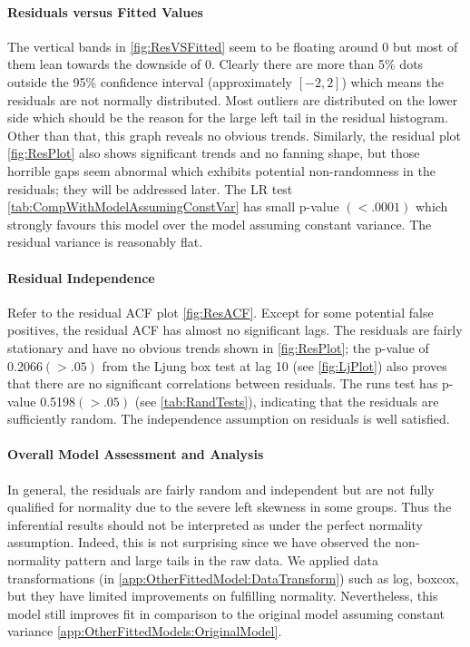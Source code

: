 \documentclass{report}
\begin{document}
\paragraph{Residuals versus Fitted Values}
The vertical bands in \ref{fig:ResVSFitted} seem to be floating around 0 but most of them lean towards the downside of 0. Clearly there are more than 5\% dots outside the 95\% confidence interval (approximately $[-2,2]$) which means the residuals are not normally distributed. Most outliers are distributed on the lower side which should be the reason for the large left tail in the residual histogram. Other than that, this graph reveals no obvious trends. Similarly, the residual plot \ref{fig:ResPlot} also shows significant trends and no fanning shape, but those horrible gaps seem abnormal which exhibits potential non-randomness in the residuals; they will be addressed later. The LR test \ref{tab:CompWithModelAssumingConstVar} has small p-value $(<.0001)$ which strongly favours this model over the model assuming constant variance. The residual variance is reasonably flat.

\paragraph{Residual Independence} Refer to the residual ACF plot \ref{fig:ResACF}. Except for some potential false positives, the residual ACF has almost no significant lags. The residuals are fairly stationary and have no obvious trends shown in \ref{fig:ResPlot}; the p-value of 0.2066$(>.05)$ from the Ljung box test at lag 10 (see \ref{fig:LjPlot}) also proves that there are no significant correlations between residuals. The runs test has p-value 0.5198$(>.05)$ (see \ref{tab:RandTests}), indicating that the residuals are sufficiently random. The independence assumption on residuals is well satisfied.


\vspace{5mm}
\paragraph{Overall Model Assessment and Analysis} In general, the residuals are fairly random and independent but are not fully qualified for normality due to the severe left skewness in some groups. Thus the inferential results should not be interpreted as under the perfect normality assumption. Indeed, this is not surprising since we have observed the non-normality pattern and large tails in the raw data. We applied data transformations (in \ref{app:OtherFittedModel:DataTransform}) such as log, boxcox, but they have limited improvements on fulfilling normality. Nevertheless, this model still improves fit in comparison to the original model assuming constant variance \ref{app:OtherFittedModels:OriginalModel}.
\end{document}
